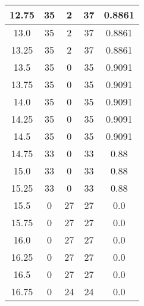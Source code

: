 \documentclass[letterpaper, 12pt]{article}
\begin{document}
\begin{longtable}{|c|c|c|c|c|}
\hline
12.75 & 35 & 2 & 37 & 0.8861 \\
\hline
13.0 & 35 & 2 & 37 & 0.8861 \\
\hline
13.25 & 35 & 2 & 37 & 0.8861 \\
\hline
13.5 & 35 & 0 & 35 & 0.9091 \\
\hline
13.75 & 35 & 0 & 35 & 0.9091 \\
\hline
14.0 & 35 & 0 & 35 & 0.9091 \\
\hline
14.25 & 35 & 0 & 35 & 0.9091 \\
\hline
14.5 & 35 & 0 & 35 & 0.9091 \\
\hline
14.75 & 33 & 0 & 33 & 0.88 \\
\hline
15.0 & 33 & 0 & 33 & 0.88 \\
\hline
15.25 & 33 & 0 & 33 & 0.88 \\
\hline
15.5 & 0 & 27 & 27 & 0.0 \\
\hline
15.75 & 0 & 27 & 27 & 0.0 \\
\hline
16.0 & 0 & 27 & 27 & 0.0 \\
\hline
16.25 & 0 & 27 & 27 & 0.0 \\
\hline
16.5 & 0 & 27 & 27 & 0.0 \\
\hline
16.75 & 0 & 24 & 24 & 0.0 \\
\hline
\end{longtable}
\end{document}
